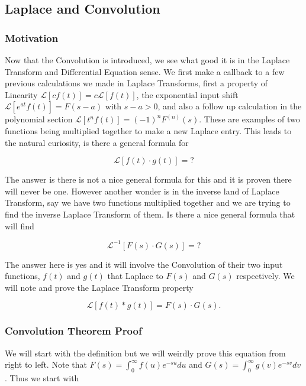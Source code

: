 \documentclass[12pt]{article}
\newcommand{\lp}{\mathscr{L}}
\begin{document}
\subsection{Laplace and Convolution}

\subsubsection{Motivation}

Now that the Convolution is introduced, we see what good it is in the Laplace Transform and Differential Equation sense. We first make a callback to a few previous calculations we made in Laplace Transforms, first a property of Linearity $\lp[cf(t)]=c\lp[f(t)]$, the exponential input shift $\lp[e^{at}f(t)]=F(s-a)$ with $s-a>0$, and also a follow up calculation in the polynomial section $\lp[t^nf(t)]=(-1)^nF^{(n)}(s)$. These are examples of two functions being multiplied together to make a new Laplace entry. This leads to the natural curiosity, is there a general formula for 

\begin{equation*}
\lp[f(t)\cdot g(t)] = ?
\end{equation*}

The answer is there is not a nice general formula for this and it is proven there will never be one. However another wonder is in the inverse land of Laplace Transform, say we have two functions multiplied together and we are trying to find the inverse Laplace Transform of them. Is there a nice general formula that will find

\begin{equation*}
    \lp^{-1}[F(s)\cdot G(s)] = ?
\end{equation*}

The answer here is yes and it will involve the Convolution of their two input functions, $f(t)$ and $g(t)$ that Laplace to $F(s)$ and $G(s)$ respectively. We will note and prove the Laplace Transform property

\begin{equation*}
    \lp[f(t) \ast g(t)]=F(s)\cdot G(s).
\end{equation*}

\subsubsection{Convolution Theorem Proof}

We will start with the definition but we will weirdly prove this equation from right to left. Note that $F(s)=\int_0^{\infty} f(u) e^{-su} du$ and $G(s)=\int_0^{\infty} g(v) e^{-sv} dv$. Thus we start with
\end{document}

